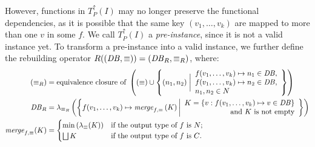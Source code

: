 However, functions in $T^\uparrow_P(I)$ may no longer preserve the functional dependencies, 
 as it is possible that the same key $(v_1,\ldots, v_k)$ are mapped to more than one $v$ in some $f$.
We call $T^\uparrow_P(I)$ a \emph{pre-instance}, since it is not a valid instance yet.
To transform a pre-instance into a valid instance, 
 we further define the rebuilding operator \(
    R((\mathit{DB}{}, \equiv)) = (\mathit{DB}{}_R, \equiv_R)
\), where:
\begin{align*}
    (\equiv_R) &=
    \text{equivalence closure of }
    \left(
    (\equiv) \cup
    \left\{
        (n_1,n_2)\;
        \bigg|
        \begin{array}{l}
          f(v_1,\ldots, v_k)\mapsto n_1\in \mathit{DB}{}, \\
          f(v_1,\ldots, v_k)\mapsto n_2\in \mathit{DB}{}, \\
          n_1, n_2\in N
        \end{array}
    \right\}
    \right)
    \\
    \mathit{DB}{}_R &=
    \lambda_{\equiv_R}
    \left(\left\{
        f(v_1,\ldots, v_k)
        \mapsto 
        \mathit{merge}_{f,\equiv}\left(
            K
        \right)
        \bigg|
        \begin{array}{r}
          K=\left\{v: f(v_1,\ldots, v_k)\mapsto v\in \mathit{DB}{}\right\} \\
          \text{and $K$ is not empty}
        \end{array}
    \right\}\right)
    \\
    \mathit{merge}_{f,\equiv}(K) &=
    \begin{cases}
        \min\left(\lambda_{\equiv}(K)\right) &\text{if the output type of $f$ is $N$;}\\
        \bigsqcup K &\text{if the output type of $f$ is $C$.}
    \end{cases}
\end{align*}

